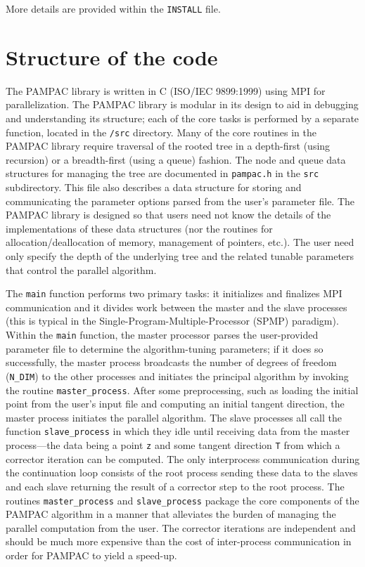 \documentclass{article}
\newcommand{\pampac}{\textsc{PAMPAC}\xspace}
\begin{document}
More details are provided within the \texttt{INSTALL} file.


\section{Structure of the code}
\label{sec:structure}

The \pampac library is written in C (ISO/IEC 9899:1999) using MPI for parallelization.
%
The \pampac library is modular in its design to aid in debugging and understanding its structure;
each of the core tasks is performed by a separate function, located in the \verb^/src^ directory.
%
Many of the core routines in the \pampac library require traversal of the rooted tree in a depth-first (using recursion) or a breadth-first (using a queue) fashion.
%
The node and queue data structures for managing the tree are documented in \texttt{pampac.h} in the \texttt{src} subdirectory.
%
This file also describes a data structure for storing and communicating the parameter options parsed from the user's parameter file.
%
The \pampac library is designed so that users need not know the details of the implementations of these data structures (nor the routines for allocation/deallocation of memory, management of pointers, etc.).
%
The user need only specify the depth of the underlying tree and the related tunable parameters that control the parallel algorithm.

%
The \texttt{main} function performs two primary tasks: it initializes and finalizes MPI communication and
it divides work between the master and the slave processes
(this is typical in the Single-Program-Multiple-Processor (SPMP) paradigm).
%
Within the \texttt{main} function, the master processor parses the user-provided parameter file to determine
the algorithm-tuning parameters; 
if it does so successfully, the master process broadcasts the number of degrees of freedom (\texttt{N\_DIM})
to the other processes and initiates the principal algorithm by invoking the routine \verb^master_process^.
%
After some preprocessing, such as loading the initial point from the user's input file and computing an initial tangent direction, the master process initiates the parallel algorithm.
%
The slave processes all call the function \verb^slave_process^ in which they idle until receiving data from the master process---the data being a point \texttt{z} and some tangent direction \texttt{T} from which a corrector iteration can be computed.
%
The only interprocess communication during the continuation loop consists
of the root process sending these data to the slaves and each slave returning the
result of a corrector step to the root process.
%
The routines \verb^master_process^ and \verb^slave_process^ package the core components of the
\pampac algorithm in a manner that alleviates the burden of managing the parallel computation from the user.
%
The corrector iterations are independent and should be much more expensive than the cost of inter-process communication in order for \pampac to yield a speed-up.
\end{document}
